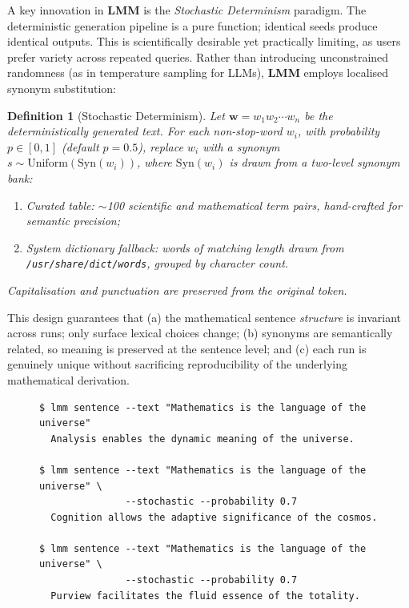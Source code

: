 \documentclass[11pt,a4paper]{article}
\newtheorem{definition}{Definition}[section]
\newcommand{\lmm}{\texorpdfstring{%
  \textbf{\color{lmmAccent}LMM}}{LMM}}
\begin{document}
A key innovation in \lmm{} is the \emph{Stochastic Determinism} paradigm. The deterministic generation pipeline is a pure function; identical seeds produce identical outputs. This is scientifically desirable yet practically limiting, as users prefer variety across repeated queries. Rather than introducing unconstrained randomness (as in temperature sampling for LLMs), \lmm{} employs localised synonym substitution:

\begin{definition}[Stochastic Determinism]
Let $\mathbf{w} = w_1 w_2 \cdots w_n$ be the deterministically generated text. For each non-stop-word $w_i$, with probability $p \in [0,1]$ (default $p = 0.5$), replace $w_i$ with a synonym $s \sim \mathrm{Uniform}(\mathrm{Syn}(w_i))$, where $\mathrm{Syn}(w_i)$ is drawn from a two-level synonym bank:
\begin{enumerate}[noitemsep,topsep=2pt]
  \item \emph{Curated table}: $\sim$100 scientific and mathematical term pairs, hand-crafted for semantic precision;
  \item \emph{System dictionary fallback}: words of matching length drawn from \texttt{/usr/share/dict/words}, grouped by character count.
\end{enumerate}
Capitalisation and punctuation are preserved from the original token.
\end{definition}

This design guarantees that (a) the mathematical sentence \emph{structure} is invariant across runs; only surface lexical choices change; (b) synonyms are semantically related, so meaning is preserved at the sentence level; and (c) each run is genuinely unique without sacrificing reproducibility of the underlying mathematical derivation.

\begin{figure}[H]
\begin{lstlisting}[style=code, caption={Stochastic synonym layer; three runs on the same seed}]
$ lmm sentence --text "Mathematics is the language of the universe"
  Analysis enables the dynamic meaning of the universe.

$ lmm sentence --text "Mathematics is the language of the universe" \
               --stochastic --probability 0.7
  Cognition allows the adaptive significance of the cosmos.

$ lmm sentence --text "Mathematics is the language of the universe" \
               --stochastic --probability 0.7
  Purview facilitates the fluid essence of the totality.
\end{lstlisting}
\end{figure}
\end{document}
